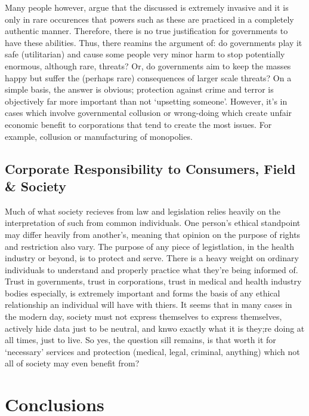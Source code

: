\documentclass[11pt, english]{article}
\begin{document}
	Many people however, argue that the discussed is extremely invasive and it is only in rare occurences that powers such as these are practiced in a completely authentic manner. Therefore, there is no true justification for governments to have these abilities. Thus, there reamins the argument of: do governments play it safe (utilitarian) and cause some people very minor harm to stop potentially enormous, although rare, threats? Or, do governments aim to keep the masses happy but suffer the (perhaps rare) consequences of larger scale threats? On a simple basis, the answer is obvious; protection against crime and terror is objectively far more important than not `upsetting someone'. However, it's in cases which involve governmental collusion or wrong-doing which create unfair economic benefit to corporations that tend to create the most issues. For example, collusion or manufacturing of monopolies.

	\subsection{Corporate Responsibility to Consumers, Field \& Society}

	Much of what society recieves from law and legislation relies heavily on the interpretation of such from common individuals. One person's ethical standpoint may differ heavily from another's, meaning that opinion on the purpose of rights and restriction also vary. The purpose of any piece of legistlation, in the health industry or beyond, is to protect and serve. There is a heavy weight on ordinary individuals to understand and properly practice what they're being informed of. Trust in governments, trust in corporations, trust in medical and health industry bodies especially, is extremely important and forms the basis of any ethical relationship an individual will have with thiers. It seems that in many cases in the modern day, society must not express themselves to express themselves, actively hide data just to be neutral, and knwo exactly what it is they;re doing at all times, just to live. So yes, the question sill remains, is that worth it for `necessary' services and protection (medical, legal, criminal, anything) which not all of society may even benefit from?

\newpage

\section{Conclusions}
\end{document}
